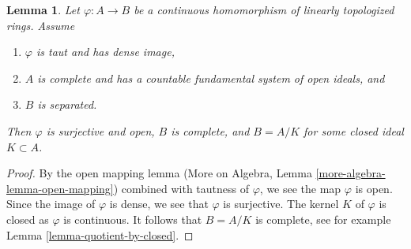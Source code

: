 \documentclass{stacks-project}
\theoremstyle{plain}
\newtheorem{lemma}[subsection]{Lemma}
\theoremstyle{definition}
\theoremstyle{remark}
\numberwithin{equation}{subsection}
\begin{document}
\begin{lemma}
\label{lemma-dense-image-surjective}
Let $\varphi : A \to B$ be a continuous homomorphism of
linearly topologized rings. Assume
\begin{enumerate}
\item $\varphi$ is taut and has dense image,
\item $A$ is complete and has a countable fundamental system of
open ideals, and
\item $B$ is separated.
\end{enumerate}
Then $\varphi$ is surjective and open, $B$ is complete, and $B = A/K$ for
some closed ideal $K \subset A$.
\end{lemma}

\begin{proof}
By the open mapping lemma (More on Algebra, Lemma
\ref{more-algebra-lemma-open-mapping})
combined with tautness of $\varphi$, 
we see the map $\varphi$ is open. Since the image of $\varphi$
is dense, we see that $\varphi$ is surjective. The kernel $K$
of $\varphi$ is closed as $\varphi$ is continuous.
It follows that $B = A/K$ is complete, see for example
Lemma \ref{lemma-quotient-by-closed}.
\end{proof}
\end{document}
